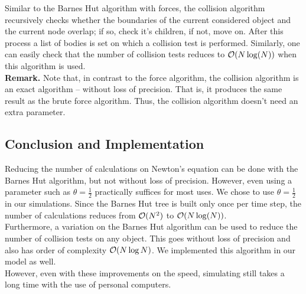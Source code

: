 Similar to the Barnes Hut algorithm with forces, the collision algorithm recursively checks whether the boundaries of the current considered object and the current node overlap; if so, check it's children, if not, move on. After this process a list of bodies is set on which a collision test is performed. Similarly, one can easily check that the number of collision tests reduces to $\mathcal{O}(N\log(N))$ when this algorithm is used.\\
\textbf{Remark.} Note that, in contrast to the force algorithm, the collision algorithm is an exact algorithm -- without loss of precision. That is, it produces the same result as the brute force algorithm. Thus, the collision algorithm doesn't need an extra parameter.
\subsection{Conclusion and Implementation}
Reducing the number of calculations on Newton's equation can be done with the Barnes Hut algorithm, but not without loss of precision. However, even using a parameter such as $\theta=\frac{1}{2}$ practically suffices for most uses. We chose to use $\theta = \frac{1}{2}$ in our simulations. Since the Barnes Hut tree is built only once per time step, the number of calculations reduces from $\mathcal{O}(N^2)$ to $\mathcal{O}(N\log(N))$.\\
Furthermore, a variation on the Barnes Hut algorithm can be used to reduce the number of collision tests on any object. This goes without loss of precision and also has order of complexity $\mathcal{O}(N\log N)$. We implemented this algorithm in our model as well.\\
However, even with these improvements on the speed, simulating still takes a long time with the use of personal computers.

